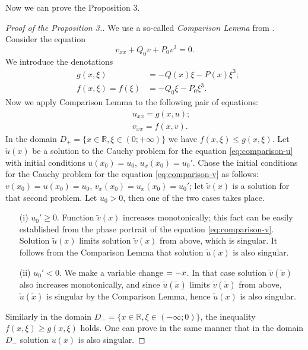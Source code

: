 Now we can prove the Proposition 3.
\begin{proof}[Proof of the Proposition 3.]
	We use a so-called {\it Comparison Lemma} from \cite[Appendix C]{AlfimovZezyulin}.
	Consider the equation
	\begin{equation}
		v_{xx} + Q_0 v + P_0 v^3 = 0.
	\end{equation}
	We introduce the denotations
	\begin{eqnarray}
		& g(x, \xi) & = -Q(x) \xi - P(x) \xi^3; \\
		& f(x, \xi) = f(\xi) & = -Q_0 \xi - P_0 \xi^3.
	\end{eqnarray}
	Now we apply Comparison Lemma to the following pair of equations:
	\begin{eqnarray}
		&& u_{xx} = g(x, u) \label{eq:comparison-u}; \\
		&& v_{xx} = f(x, v) \label{eq:comparison-v}.
	\end{eqnarray}
	In the domain $D_+ = \{ x \in \mathbb{R}, \xi \in (0; +\infty) \}$ we have $f(x, \xi) \le g(x, \xi)$.
	Let $\widetilde{u}(x)$ be a solution to the Cauchy problem for the equation \eqref{eq:comparison-u} with initial conditions $u(x_0) = u_0$, $u_x(x_0) = u_0'$.
	Chose the initial conditions for the Cauchy problem for the equation \eqref{eq:comparison-v} as follows: $v(x_0) = u(x_0) = u_0$, $v_x(x_0) = u_x(x_0) = u_0'$; let $\widetilde{v}(x)$ is a solution for that second problem.
	Let $u_0 > 0$, then one of the two cases takes place.
	\begin{enumerate}
		\item[(i)] $u_0' \ge 0$.
		Function $\widetilde{v}(x)$ increases monotonically; this fact can be easily established from the phase portrait of the equation \eqref{eq:comparison-v}.
		Solution $\widetilde{u}(x)$ limits solution $\widetilde{v}(x)$ from above, which is singular.
		It follows from the Comparison Lemma that solution $\widetilde{u}(x)$ is also singular.
		\item[(ii)] $u_0' < 0$.
		We make a variable change $\title{x} = -x$.
		In that case solution $\widetilde{v}(\widetilde{x})$ also increases monotonically, and since $\widetilde{u}(\widetilde{x})$ limits $\widetilde{v}(\widetilde{x})$ from above, $\widetilde{u}(\widetilde{x})$ is singular by the Comparison Lemma, hence $\widetilde{u}(x)$ is also singular.
	\end{enumerate}
	Similarly in the domain $D_- = \{ x \in \mathbb{R}, \xi \in (-\infty; 0) \}$, the inequality $f(x, \xi) \ge g(x, \xi)$ holds.
	One can prove in the same manner that in the domain $D_-$ solution $u(x)$ is also singular.
\end{proof}

